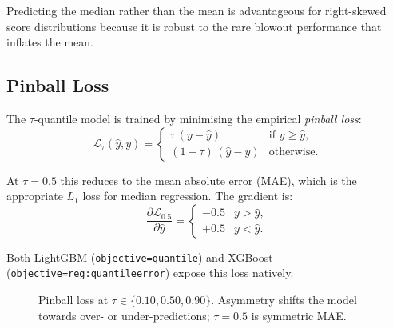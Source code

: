\documentclass[conference]{IEEEtran}
\begin{document}
Predicting the median rather than the mean is advantageous for
right-skewed score distributions because it is robust to the rare
blowout performance that inflates the mean.

\subsection{Pinball Loss}

The $\tau$-quantile model is trained by minimising the empirical
\emph{pinball loss}:
\begin{equation}
  \mathcal{L}_\tau(\hat{y},y)
    = \begin{cases}
        \tau\,(y - \hat{y})       & \text{if } y \ge \hat{y},\\
        (1-\tau)\,(\hat{y} - y)  & \text{otherwise.}
      \end{cases}
\label{eq:pinball}
\end{equation}

At $\tau = 0.5$ this reduces to the mean absolute error (MAE), which
is the appropriate $L_1$ loss for median regression.  The gradient
is:
\begin{equation}
  \frac{\partial \mathcal{L}_{0.5}}{\partial \hat{y}}
    = \begin{cases} -0.5 & y > \hat{y},\\ +0.5 & y < \hat{y}.\end{cases}
\end{equation}

Both LightGBM (\texttt{objective=quantile}) and XGBoost
(\texttt{objective=reg:quantileerror}) expose this loss natively.

\begin{figure}[!t]
\centering
{}
\caption{Pinball loss at $\tau\in\{0.10,0.50,0.90\}$.  Asymmetry shifts
the model towards over- or under-predictions; $\tau=0.5$ is symmetric MAE.}
\label{fig:pinball}
\end{figure}
\end{document}
